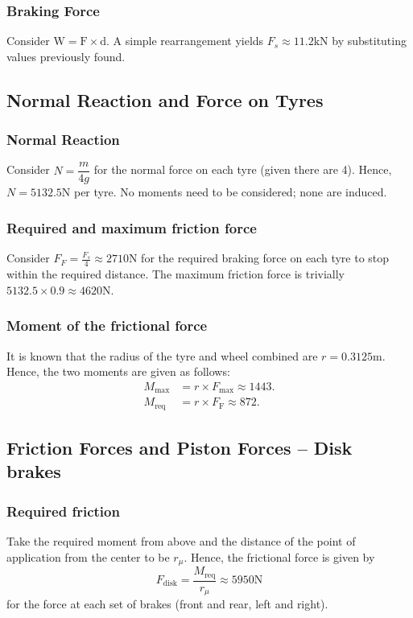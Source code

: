 \documentclass[../main.tex]{subfiles}
\begin{document}
\subsubsection{Braking Force}
Consider $\mathrm{W} = \mathrm{F} \times \mathrm{d}$.
A simple rearrangement yields $F_s \approx 11.2 \mathrm{kN}$ by substituting values previously found.

\subsection{Normal Reaction and Force on Tyres}
\subsubsection{Normal Reaction}
Consider $N = \dfrac{m}{4g}$ for the normal force on each tyre (given there are 4).
Hence, $N = 5132.5 \mathrm{N}$ per tyre.
No moments need to be considered; none are induced.
\subsubsection{Required and maximum friction force}
Consider $F_F = \frac{F_s}{4} \approx 2710 \mathrm{N}$ for the required braking force on each tyre to stop within the required distance.
The maximum friction force is trivially $5132.5\times0.9 \approx 4620 \mathrm{N}$.
\subsubsection{Moment of the frictional force}
It is known that the radius of the tyre and wheel combined are $r = 0.3125 \mathrm{m}$.
Hence, the two moments are given as follows:
\begin{align*}
	M_\text{max} & = r\times F_\text{max} \approx 1443. \\
	M_\text{req} & = r\times F_\text{F} \approx 872.
\end{align*}

\subsection{Friction Forces and Piston Forces -- Disk brakes}
\subsubsection{Required friction}
Take the required moment from above and the distance of the point of application from the center to be $r_\mu$.
Hence, the frictional force is given by
\[F_\text{disk} = \dfrac{M_\text{req}}{r_\mu} \approx 5950 \mathrm{N}\]
for the force at each set of brakes (front and rear, left and right).
\end{document}
